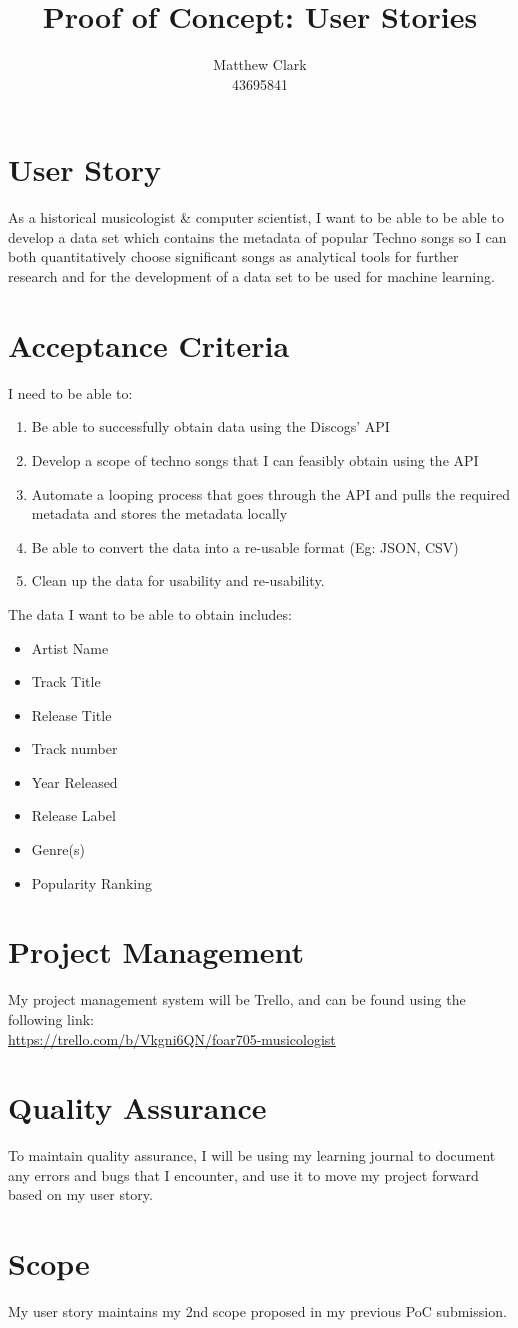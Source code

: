 \documentclass{article}
\title{Proof of Concept: User Stories}
\author{Matthew Clark\\43695841}
\date{\vspace{-5ex}}
\begin{document}
\maketitle
\newpage
\section*{User Story}
As a historical musicologist \& computer scientist, I want to be able to be able to develop a data set which contains the metadata of popular Techno songs so I can both quantitatively choose significant songs as analytical tools for further research and for the development of a data set to be used for machine learning.
\section*{Acceptance Criteria}
I need to be able to:
\begin{enumerate}
    \item Be able to successfully obtain data using the Discogs' API
    \item Develop a scope of techno songs that I can feasibly obtain using the API
    \item Automate a looping process that goes through the API and pulls the required metadata and stores the metadata locally
    \item Be able to convert the data into a re-usable format (Eg: JSON, CSV)
    \item Clean up the data for usability and re-usability.
\end{enumerate}
The data I want to be able to obtain includes:
\begin{itemize}
    \item Artist Name
    \item Track Title
    \item Release Title
    \item Track number
    \item Year Released
    \item Release Label
    \item Genre(s)
    \item Popularity Ranking
\end{itemize}
\section*{Project Management}
My project management system will be Trello, and can be found using the following link:\\
\url{https://trello.com/b/Vkgni6QN/foar705-musicologist}
\section*{Quality Assurance}
To maintain quality assurance, I will be using my learning journal to document any errors and bugs that I encounter, and use it to move my project forward based on my user story.
\section*{Scope}
My user story maintains my 2nd scope proposed in my previous PoC submission.
\end{document}

